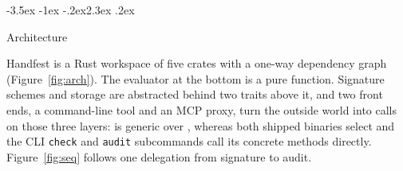 \documentclass[10pt,twocolumn]{article}
\makeatletter
\theoremstyle{plain}
\theoremstyle{definition}
\renewcommand\section{\@startsection{section}{1}{\z@}%
  {-3.5ex \@plus -1ex \@minus -.2ex}{2.3ex \@plus .2ex}%
  {\normalfont\Large\bfseries\raggedright}}
\makeatother
\begin{document}
\section{Architecture}
\label{sec:arch}

Handfest is a Rust workspace of five crates with a one-way dependency graph (Figure~\ref{fig:arch}). The evaluator at the bottom is a pure function. Signature schemes and storage are abstracted behind two traits above it, and two front ends, a command-line tool and an MCP proxy, turn the outside world into calls on those three layers:  is generic over , whereas both shipped binaries select  and the CLI \texttt{check} and \texttt{audit} subcommands call its concrete methods directly. Figure~\ref{fig:seq} follows one delegation from signature to audit.
\end{document}
